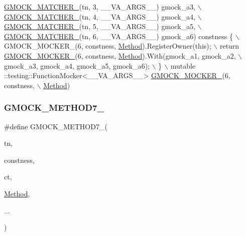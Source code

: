 \begin{DoxyCode}
                     \hyperlink{gmock-generated-function-mockers_8h_aa87d0009fe91f1c89d658776b55a769c}{GMOCK\_MATCHER\_}(tn, 3, \_\_VA\_ARGS\_\_) gmock\_a3, \(\backslash\)
                     \hyperlink{gmock-generated-function-mockers_8h_aa87d0009fe91f1c89d658776b55a769c}{GMOCK\_MATCHER\_}(tn, 4, \_\_VA\_ARGS\_\_) gmock\_a4, \(\backslash\)
                     \hyperlink{gmock-generated-function-mockers_8h_aa87d0009fe91f1c89d658776b55a769c}{GMOCK\_MATCHER\_}(tn, 5, \_\_VA\_ARGS\_\_) gmock\_a5, \(\backslash\)
                     \hyperlink{gmock-generated-function-mockers_8h_aa87d0009fe91f1c89d658776b55a769c}{GMOCK\_MATCHER\_}(tn, 6, \_\_VA\_ARGS\_\_) gmock\_a6) constness \{ \(\backslash\)
    GMOCK\_MOCKER\_(6, constness, \hyperlink{gmock-spec-builders__test_8cc_a95606368148f3e5aab5db46c32466afd}{Method}).RegisterOwner(\textcolor{keyword}{this}); \(\backslash\)
    return \hyperlink{gmock-generated-function-mockers_8h_a7d362499e27b1bc3a9806dd3cf58a5b7}{GMOCK\_MOCKER\_}(6, constness, \hyperlink{gmock-spec-builders__test_8cc_a95606368148f3e5aab5db46c32466afd}{Method}).With(gmock\_a1, gmock\_a2, \(\backslash\)
        gmock\_a3, gmock\_a4, gmock\_a5, gmock\_a6); \(\backslash\)
  \} \(\backslash\)
  mutable ::testing::FunctionMocker<\_\_VA\_ARGS\_\_> \hyperlink{gmock-generated-function-mockers_8h_a7d362499e27b1bc3a9806dd3cf58a5b7}{GMOCK\_MOCKER\_}(6, constness, \(\backslash\)
      \hyperlink{gmock-spec-builders__test_8cc_a95606368148f3e5aab5db46c32466afd}{Method})
\end{DoxyCode}
\mbox{\label{gmock-generated-function-mockers_8h_ab98a8399ba62b53b375c2807f4d39d2f}} 
\subsubsection{\texorpdfstring{G\+M\+O\+C\+K\+\_\+\+M\+E\+T\+H\+O\+D7\+\_\+}{GMOCK\_METHOD7\_}}
{\footnotesize\ttfamily \#define G\+M\+O\+C\+K\+\_\+\+M\+E\+T\+H\+O\+D7\+\_\+(\begin{DoxyParamCaption}\item[{}]{tn,  }\item[{}]{constness,  }\item[{}]{ct,  }\item[{}]{\hyperlink{gmock-spec-builders__test_8cc_a95606368148f3e5aab5db46c32466afd}{Method},  }\item[{}]{... }\end{DoxyParamCaption})}

